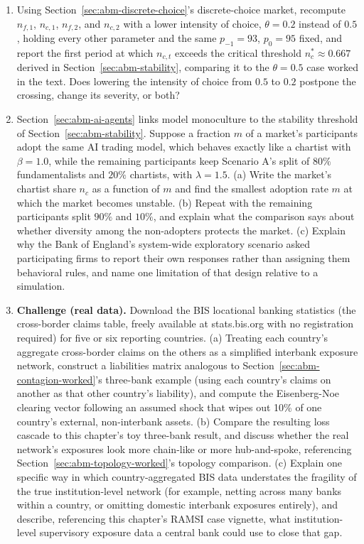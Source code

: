 \documentclass[../ai_in_finance]{subfiles}
\begin{document}
\begin{enumerate}[exercises]
    \item Using Section~\ref{sec:abm-discrete-choice}'s discrete-choice market, recompute $n_{f,1}$, $n_{c,1}$, $n_{f,2}$, and $n_{c,2}$ with a lower intensity of choice, $\theta=0.2$ instead of $0.5$, holding every other parameter and the same $p_{-1}=93$, $p_0=95$ fixed, and report the first period at which $n_{c,t}$ exceeds the critical threshold $n_c^{*}\approx0.667$ derived in Section~\ref{sec:abm-stability}, comparing it to the $\theta=0.5$ case worked in the text. Does lowering the intensity of choice from $0.5$ to $0.2$ postpone the crossing, change its severity, or both?
    \item Section~\ref{sec:abm-ai-agents} links model monoculture to the stability threshold of Section~\ref{sec:abm-stability}. Suppose a fraction $m$ of a market's participants adopt the same AI trading model, which behaves exactly like a chartist with $\beta=1.0$, while the remaining participants keep Scenario A's split of $80\%$ fundamentalists and $20\%$ chartists, with $\lambda=1.5$. (a) Write the market's chartist share $n_c$ as a function of $m$ and find the smallest adoption rate $m$ at which the market becomes unstable. (b) Repeat with the remaining participants split $90\%$ and $10\%$, and explain what the comparison says about whether diversity among the non-adopters protects the market. (c) Explain why the Bank of England's system-wide exploratory scenario asked participating firms to report their own responses rather than assigning them behavioral rules, and name one limitation of that design relative to a simulation.
    \item \textbf{Challenge (real data).} Download the BIS locational banking statistics (the cross-border claims table, freely available at stats.bis.org with no registration required) for five or six reporting countries. (a) Treating each country's aggregate cross-border claims on the others as a simplified interbank exposure network, construct a liabilities matrix analogous to Section~\ref{sec:abm-contagion-worked}'s three-bank example (using each country's claims on another as that other country's liability), and compute the Eisenberg-Noe clearing vector following an assumed shock that wipes out 10\% of one country's external, non-interbank assets. (b) Compare the resulting loss cascade to this chapter's toy three-bank result, and discuss whether the real network's exposures look more chain-like or more hub-and-spoke, referencing Section~\ref{sec:abm-topology-worked}'s topology comparison. (c) Explain one specific way in which country-aggregated BIS data understates the fragility of the true institution-level network (for example, netting across many banks within a country, or omitting domestic interbank exposures entirely), and describe, referencing this chapter's RAMSI case vignette, what institution-level supervisory exposure data a central bank could use to close that gap.
\end{enumerate}
\end{document}
